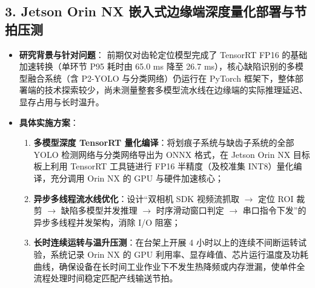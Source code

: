 \subsection*{3. Jetson Orin NX 嵌入式边缘端深度量化部署与节拍压测}
\begin{itemize}
    \item \textbf{研究背景与针对问题}：
    前期仅对齿轮定位模型完成了 TensorRT FP16 的基础加速转换（单环节 P95 耗时由 65.0 ms 降至 26.7 ms），核心缺陷识别的多模型融合系统（含 P2-YOLO 与分类网络）仍运行在 PyTorch 框架下，整体部署端的技术探索较少，尚未测量整套多模型流水线在边缘端的实际推理延迟、显存占用与长时温升。
    \item \textbf{具体实施方案}：
    \begin{enumerate}
        \item \textbf{多模型深度 TensorRT 量化编译}：将划痕子系统与缺齿子系统的全部 YOLO 检测网络与分类网络导出为 ONNX 格式，在 Jetson Orin NX 目标板上利用 TensorRT 工具链进行 FP16 半精度（及校准集 INT8）量化编译，充分调用 Orin NX 的 GPU 与硬件加速核心；
        \item \textbf{异步多线程流水线优化}：设计“双相机 SDK 视频流抓取 $\rightarrow$ 定位 ROI 裁剪 $\rightarrow$ 缺陷多模型并发推理 $\rightarrow$ 时序滑动窗口判定 $\rightarrow$ 串口指令下发”的异步多线程并发架构，消除 I/O 阻塞；
        \item \textbf{长时连续运转与温升压测}：在台架上开展 4 小时以上的连续不间断运转试验，系统记录 Orin NX 的 GPU 利用率、显存峰值、芯片运行温度及功耗曲线，确保设备在长时间工业作业下不发生热降频或内存泄漏，使单件全流程处理时间稳定匹配产线输送节拍。
    \end{enumerate}
\end{itemize}



